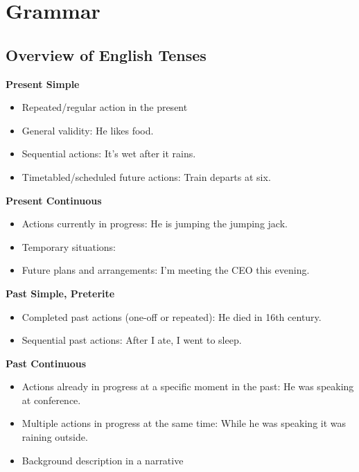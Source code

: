 \documentclass[a4paper,12pt]{report}
\begin{document}
\titlep
\tocp


\chapter{Grammar}

\section{Overview of English Tenses}

\textbf{Present Simple}


\begin{itemize}
	\item Repeated/regular action in the present
	\item General validity: He likes food.
	\item Sequential actions: It's wet after it rains.
	\item Timetabled/scheduled future actions: Train departs at six.
\end{itemize}

\noindent
\textbf{Present Continuous}

\begin{itemize}
	\item Actions currently in progress: He is jumping the jumping jack.
	\item Temporary situations:
	\item Future plans and arrangements: I'm meeting the CEO this evening.
\end{itemize}

\noindent
\textbf{Past Simple, Preterite}

\begin{itemize}
	\item Completed past actions (one-off or repeated): He died in 16th century.
	\item Sequential past actions: After I ate, I went to sleep.
\end{itemize}

\noindent
\textbf{Past Continuous}

\begin{itemize}
	\item Actions already in progress at a specific moment in the past: He was speaking at conference.
	\item Multiple actions in progress at the same time: While he was speaking it was raining outside.
	\item Background description in a narrative
\end{itemize}
\end{document}
